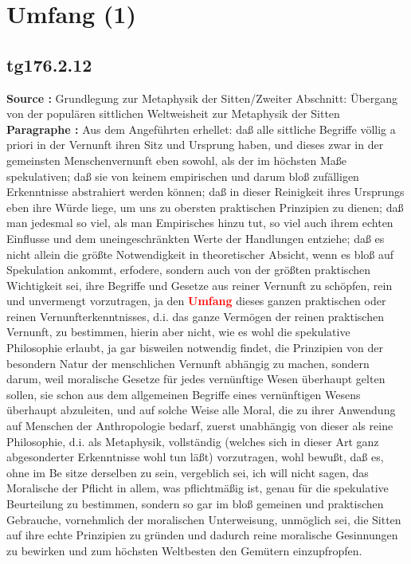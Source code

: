 \documentclass[a4paper,12pt,twoside]{book}
\newcommand{\match}[1]{\textcolor{red}{\textbf{#1}}}
\newcommand{\unnumberedsection}[1]{
	\section*{#1}
	\addcontentsline{toc}{section}{#1}
	\markright{#1}
}
\begin{document}
	\unnumberedsection{Umfang (1)} 
	\subsection*{tg176.2.12} 
	\textbf{Source : }Grundlegung zur Metaphysik der Sitten/Zweiter Abschnitt: Übergang von der populären sittlichen Weltweisheit zur Metaphysik der Sitten\\  
	
	\noindent\textbf{Paragraphe : }Aus dem Angeführten erhellet: daß alle sittliche Begriffe völlig a priori in der Vernunft ihren Sitz und Ursprung haben, und dieses zwar in der gemeinsten Menschenvernunft eben sowohl, als der im höchsten Maße spekulativen; daß sie von keinem empirischen und darum bloß zufälligen Erkenntnisse  abstrahiert werden können; daß in dieser Reinigkeit ihres Ursprungs eben ihre Würde liege, um uns zu obersten praktischen Prinzipien zu dienen; daß man jedesmal so viel, als man Empirisches hinzu tut, so viel auch ihrem echten Einflusse und dem uneingeschränkten Werte der Handlungen entziehe; daß es nicht allein die größte Notwendigkeit in theoretischer Absicht, wenn es bloß auf Spekulation ankommt, erfodere, sondern auch von der größten praktischen Wichtigkeit sei, ihre Begriffe und Gesetze aus reiner Vernunft zu schöpfen, rein und unvermengt vorzutragen, ja den \match{Umfang} dieses ganzen praktischen oder reinen Vernunfterkenntnisses, d.i. das ganze Vermögen der reinen praktischen Vernunft, zu bestimmen, hierin aber nicht, wie es wohl die spekulative Philosophie erlaubt, ja gar bisweilen notwendig findet, die Prinzipien von der besondern Natur der menschlichen Vernunft abhängig zu machen, sondern darum, weil moralische Gesetze für jedes vernünftige Wesen überhaupt gelten sollen, sie schon aus dem allgemeinen Begriffe eines vernünftigen Wesens überhaupt abzuleiten, und auf solche Weise alle Moral, die zu ihrer Anwendung auf Menschen der Anthropologie bedarf, zuerst unabhängig von dieser als reine Philosophie, d.i. als Metaphysik, vollständig (welches sich in dieser Art ganz abgesonderter Erkenntnisse wohl tun läßt) vorzutragen, wohl bewußt, daß es, ohne im Be sitze derselben zu sein, vergeblich sei, ich will nicht sagen, das Moralische der Pflicht in allem, was pflichtmäßig ist, genau für die spekulative Beurteilung zu bestimmen, sondern so gar im bloß gemeinen und praktischen Gebrauche, vornehmlich der moralischen Unterweisung, unmöglich sei, die Sitten auf ihre echte Prinzipien zu gründen und dadurch reine moralische Gesinnungen zu bewirken und zum höchsten Weltbesten den Gemütern einzupfropfen. 
	
\end{document}

